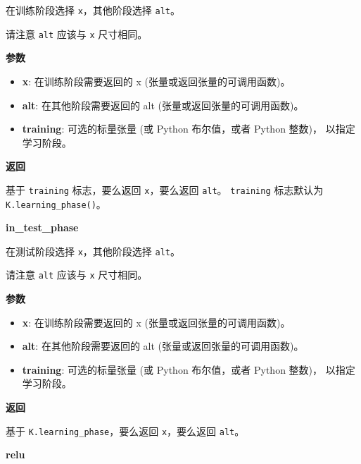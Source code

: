 在训练阶段选择 \texttt{x}，其他阶段选择 \texttt{alt}。

请注意 \texttt{alt} 应该与 \texttt{x} 尺寸相同。

\textbf{参数}

\begin{itemize}
\tightlist
\item
  \textbf{x}: 在训练阶段需要返回的 x (张量或返回张量的可调用函数)。
\item
  \textbf{alt}: 在其他阶段需要返回的 alt (张量或返回张量的可调用函数)。
\item
  \textbf{training}: 可选的标量张量 (或 Python 布尔值，或者 Python
  整数)， 以指定学习阶段。
\end{itemize}

\textbf{返回}

基于 \texttt{training} 标志，要么返回 \texttt{x}，要么返回
\texttt{alt}。 \texttt{training} 标志默认为
\texttt{K.learning\_phase()}。


\textbf{in\_test\_phase}\label{inux5ftestux5fphase}

\begin{Shaded}
\begin{Highlighting}[]
\OperatorTok{=}\NormalTok{)}
\end{Highlighting}
\end{Shaded}

在测试阶段选择 \texttt{x}，其他阶段选择 \texttt{alt}。

请注意 \texttt{alt} 应该与 \texttt{x} 尺寸相同。

\textbf{参数}

\begin{itemize}
\tightlist
\item
  \textbf{x}: 在训练阶段需要返回的 x (张量或返回张量的可调用函数)。
\item
  \textbf{alt}: 在其他阶段需要返回的 alt (张量或返回张量的可调用函数)。
\item
  \textbf{training}: 可选的标量张量 (或 Python 布尔值，或者 Python
  整数)， 以指定学习阶段。
\end{itemize}

\textbf{返回}

基于 \texttt{K.learning\_phase}，要么返回 \texttt{x}，要么返回
\texttt{alt}。


\textbf{relu}\label{relu}

\begin{Shaded}
\begin{Highlighting}[]
\OperatorTok{=}\OperatorTok{=}\NormalTok{)}
\end{Highlighting}
\end{Shaded}

